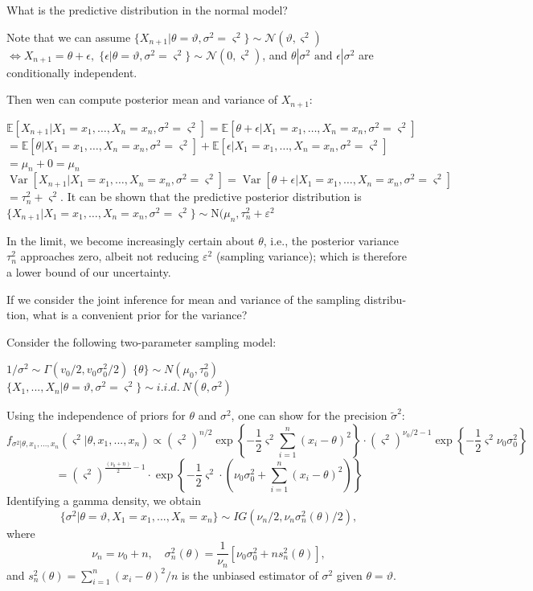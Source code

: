 What is the predictive distribution in the normal model?

Note that we can assume \( \{ X_{n+1} | \theta = \vartheta, \sigma^2 = \varsigma^2 \} \sim \mathcal{N}(\vartheta, \varsigma^2) \)
\( \iff X_{n+1} = \theta + \epsilon, \; \{ \epsilon | \theta = \vartheta, \sigma^2 = \varsigma^2 \} \sim \mathcal{N}(0, \varsigma^2) \),
and \( \theta | \sigma^2 \text{ and } \epsilon | \sigma^2 \) are conditionally independent.

Then wen can compute posterior mean and variance of \( X_{n+1} \): 

\(
\mathbb{E}[X_{n+1}|X_1 = x_1, \ldots, X_n = x_n, \sigma^2 = \varsigma^2] = \mathbb{E}[\theta + \epsilon|X_1 = x_1, \ldots, X_n = x_n, \sigma^2 = \varsigma^2]
\)
\(
= \mathbb{E}[\theta|X_1 = x_1, \ldots, X_n = x_n, \sigma^2 = \varsigma^2] + \mathbb{E}[\epsilon|X_1 = x_1, \ldots, X_n = x_n, \sigma^2 = \varsigma^2]
\)
\(
= \mu_n + 0 = \mu_n
\)
\(
\operatorname{Var}[X_{n+1}|X_1 = x_1, \ldots, X_n = x_n, \sigma^2 = \varsigma^2] = \operatorname{Var}[\theta + \epsilon|X_1 = x_1, \ldots, X_n = x_n, \sigma^2 = \varsigma^2]
\)
\(
= \tau_n^2 + \varsigma^2.
\)
It can be shown that the predictive posterior distribution is
\( \{ X_{n+1}|X_1 = x_1, \ldots, X_n = x_n, \sigma^2 = \varsigma^2 \} \sim \text{N}(\mu_n, \tau^2_n + \varepsilon^2 \)

In the limit,
we become increasingly certain about \( \theta \), i.e., the posterior variance \( \tau_n^2 \) approaches zero,
albeit not reducing \( \varepsilon^2 \) (sampling variance); which is therefore a lower bound of our uncertainty.


If we consider the joint inference for mean and variance of the sampling distribu-
tion, what is a convenient prior for the variance?


Consider the following two-parameter sampling model:

\( 1/\sigma^2 \sim \Gamma(v_0/2, v_0\sigma_0^2/2) \)
\( \{\theta\} \sim N(\mu_0, \tau_0^2) \)
\( \{X_1, ..., X_n | \theta = \vartheta, \sigma^2 = \varsigma^2 \} \sim i.i.d. \ N(\theta, \sigma^2) \)


Using the independence of priors for \( \theta \) and \( \sigma^2 \), one can show for the precision \( \tilde{\sigma}^2 \):
\[ f_{\sigma^2 | \theta, x_1, ..., x_n}(\varsigma^2 | \theta, x_1, ..., x_n) \propto \left( \varsigma^2 \right)^{n/2} \exp \left\{ -\frac{1}{2}\varsigma^2 \sum_{i=1}^{n} (x_i - \theta)^2 \right\} \cdot \left( \varsigma^2 \right)^{\nu_0/2 - 1} \exp \left\{ -\frac{1}{2}\varsigma^2 \nu_0 \sigma_0^2 \right\} \]
\[ = \left( \varsigma^2 \right)^{\frac{(\nu_0 + n)}{2} - 1} \cdot \exp \left\{ -\frac{1}{2}\varsigma^2 \cdot \left( \nu_0 \sigma_0^2 + \sum_{i=1}^{n} (x_i - \theta)^2 \right) \right\} \]
Identifying a gamma density, we obtain
\[ \{\sigma^2 | \theta = \vartheta, X_1 = x_1, ..., X_n = x_n \} \sim IG(\nu_n/2, \nu_n \sigma_n^2(\theta)/2), \]
where
\[ \nu_n = \nu_0 + n, \quad \sigma_n^2(\theta) = \frac{1}{\nu_n} [\nu_0 \sigma_0^2 + n s_n^2(\theta)], \]
and \( s_n^2(\theta) = \sum_{i=1}^{n} (x_i - \theta)^2 / n \) is the unbiased estimator of \( \sigma^2 \) given \( \theta = \vartheta \).

